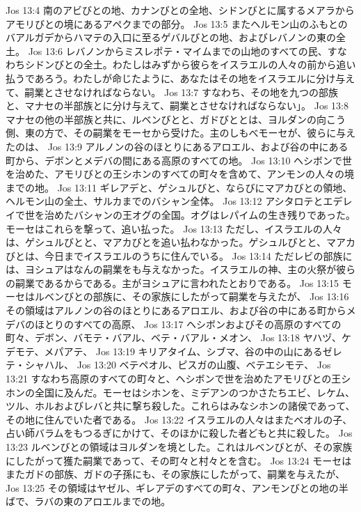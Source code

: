 Jos 13:4  南のアビびとの地、カナンびとの全地、シドンびとに属するメアラからアモリびとの境にあるアペクまでの部分。
Jos 13:5  またヘルモン山のふもとのバアルガデからハマテの入口に至るゲバルびとの地、およびレバノンの東の全土。
Jos 13:6  レバノンからミスレポテ・マイムまでの山地のすべての民、すなわちシドンびとの全土。わたしはみずから彼らをイスラエルの人々の前から追い払うであろう。わたしが命じたように、あなたはその地をイスラエルに分け与えて、嗣業とさせなければならない。
Jos 13:7  すなわち、その地を九つの部族と、マナセの半部族とに分け与えて、嗣業とさせなければならない」。
Jos 13:8  マナセの他の半部族と共に、ルベンびとと、ガドびととは、ヨルダンの向こう側、東の方で、その嗣業をモーセから受けた。主のしもべモーセが、彼らに与えたのは、
Jos 13:9  アルノンの谷のほとりにあるアロエル、および谷の中にある町から、デボンとメデバの間にある高原のすべての地。
Jos 13:10  ヘシボンで世を治めた、アモリびとの王シホンのすべての町々を含めて、アンモンの人々の境までの地。
Jos 13:11  ギレアデと、ゲシュルびと、ならびにマアカびとの領地、ヘルモン山の全土、サルカまでのバシャン全体。
Jos 13:12  アシタロテとエデレイで世を治めたバシャンの王オグの全国。オグはレパイムの生き残りであった。モーセはこれらを撃って、追い払った。
Jos 13:13  ただし、イスラエルの人々は、ゲシュルびとと、マアカびとを追い払わなかった。ゲシュルびとと、マアカびとは、今日までイスラエルのうちに住んでいる。
Jos 13:14  ただレビの部族には、ヨシュアはなんの嗣業をも与えなかった。イスラエルの神、主の火祭が彼らの嗣業であるからである。主がヨシュアに言われたとおりである。
Jos 13:15  モーセはルベンびとの部族に、その家族にしたがって嗣業を与えたが、
Jos 13:16  その領域はアルノンの谷のほとりにあるアロエル、および谷の中にある町からメデバのほとりのすべての高原、
Jos 13:17  ヘシボンおよびその高原のすべての町々、デボン、バモテ・バアル、ベテ・バアル・メオン、
Jos 13:18  ヤハヅ、ケデモテ、メパアテ、
Jos 13:19  キリアタイム、シブマ、谷の中の山にあるゼレテ・シャハル、
Jos 13:20  ベテペオル、ピスガの山腹、ベテエシモテ、
Jos 13:21  すなわち高原のすべての町々と、ヘシボンで世を治めたアモリびとの王シホンの全国に及んだ。モーセはシホンを、ミデアンのつかさたちエビ、レケム、ツル、ホルおよびレバと共に撃ち殺した。これらはみなシホンの諸侯であって、その地に住んでいた者である。
Jos 13:22  イスラエルの人々はまたベオルの子、占い師バラムをもつるぎにかけて、そのほかに殺した者どもと共に殺した。
Jos 13:23  ルベンびとの領域はヨルダンを境とした。これはルベンびとが、その家族にしたがって獲た嗣業であって、その町々と村々とを含む。
Jos 13:24  モーセはまたガドの部族、ガドの子孫にも、その家族にしたがって、嗣業を与えたが、
Jos 13:25  その領域はヤゼル、ギレアデのすべての町々、アンモンびとの地の半ばで、ラバの東のアロエルまでの地。
